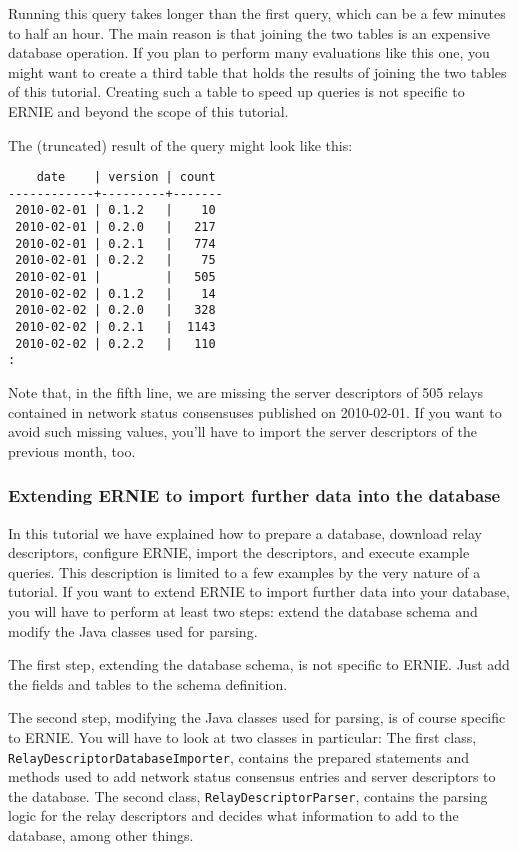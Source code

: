 \documentclass{article}
\begin{document}
Running this query takes longer than the first query, which can be a few
minutes to half an hour.
The main reason is that joining the two tables is an expensive database
operation.
If you plan to perform many evaluations like this one, you might want to
create a third table that holds the results of joining the two tables of
this tutorial.
Creating such a table to speed up queries is not specific to ERNIE and
beyond the scope of this tutorial.

The (truncated) result of the query might look like this:

\begin{verbatim}
    date    | version | count
------------+---------+-------
 2010-02-01 | 0.1.2   |    10
 2010-02-01 | 0.2.0   |   217
 2010-02-01 | 0.2.1   |   774
 2010-02-01 | 0.2.2   |    75
 2010-02-01 |         |   505
 2010-02-02 | 0.1.2   |    14
 2010-02-02 | 0.2.0   |   328
 2010-02-02 | 0.2.1   |  1143
 2010-02-02 | 0.2.2   |   110
:
\end{verbatim}

Note that, in the fifth line, we are missing the server descriptors of 505
relays contained in network status consensuses published on 2010-02-01.
If you want to avoid such missing values, you'll have to import the server
descriptors of the previous month, too.

\subsubsection{Extending ERNIE to import further data into the database}

In this tutorial we have explained how to prepare a database, download
relay descriptors, configure ERNIE, import the descriptors, and execute
example queries.
This description is limited to a few examples by the very nature of a
tutorial.
If you want to extend ERNIE to import further data into your database,
you will have to perform at least two steps:
extend the database schema and modify the Java classes used for parsing.

The first step, extending the database schema, is not specific to ERNIE.
Just add the fields and tables to the schema definition.

The second step, modifying the Java classes used for parsing, is of course
specific to ERNIE.
You will have to look at two classes in particular:
The first class, \verb+RelayDescriptorDatabaseImporter+, contains the
prepared statements and methods used to add network status consensus
entries and server descriptors to the database.
The second class, \verb+RelayDescriptorParser+, contains the parsing logic
for the relay descriptors and decides what information to add to the
database, among other things.
\end{document}
